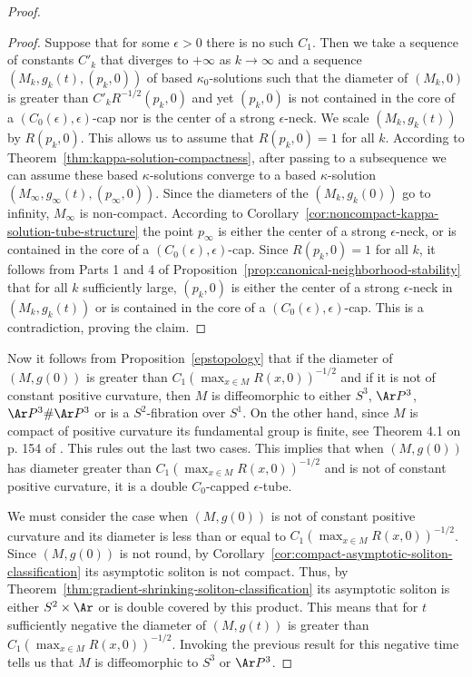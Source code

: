 \begin{proof}
\begin{proof}
Suppose that for some $\epsilon>0$ there is no such $C_1$. Then we
take a sequence of constants $C'_k$ that diverges to $+\infty$ as
$k\rightarrow \infty$ and a sequence $(M_k,g_k(t), (p_k,0))$ of
based $\kappa_0$-solutions such that the diameter of $(M_k,0)$ is
greater than $C'_kR^{-1/2}(p_k,0)$ and yet $(p_k,0)$ is not
contained in the core of a $(C_0(\epsilon),\epsilon)$-cap nor is the
center of a strong $\epsilon$-neck.  We scale $(M_k,g_k(t))$ by
$R(p_k,0)$. This allows us to assume that $R(p_k,0)=1$ for all $k$.
According to Theorem~\ref{thm:kappa-solution-compactness}, after passing to a
subsequence we can assume these based $\kappa$-solutions converge to
a based $\kappa$-solution $(M_\infty,g_\infty(t),(p_\infty,0))$.
Since the diameters of the $(M_k,g_k(0))$ go to infinity, $M_\infty$
is non-compact. According to Corollary~\ref{cor:noncompact-kappa-solution-tube-structure} the point
$p_\infty$ is either the center of a strong $\epsilon$-neck, or is
contained in the core of  a $(C_0(\epsilon),\epsilon)$-cap. Since
$R(p_k,0)=1$ for all $k$, it follows from Parts 1 and 4 of
Proposition~\ref{prop:canonical-neighborhood-stability} that for all $k$ sufficiently large,
$(p_k,0)$ is either the center of a strong $\epsilon$-neck in
$(M_k,g_k(t))$ or is contained in the core of a
$(C_0(\epsilon),\epsilon)$-cap. This is a contradiction, proving the
claim.
\end{proof}


Now it follows from Proposition~\ref{epstopology} that if the
diameter of $(M,g(0))$ is greater than $C_1(\max_{x\in
M}R(x,0))^{-1/2}$ and if it is not of constant positive curvature,
then $M$ is diffeomorphic to either $S^3$, $\Ar P^3$,  $\Ar P^3\#\Ar
P^3$ or is a $S^2$-fibration over $S^1$. On the other hand, since
$M$ is compact of positive curvature its fundamental group is
finite, see Theorem 4.1 on p. 154 of \cite{Petersen}. This rules out
the last two cases. This implies that when $(M,g(0))$ has diameter
greater than $C_1(\max_{x\in M}R(x,0))^{-1/2}$ and is not of
constant positive curvature, it is a double $C_0$-capped
$\epsilon$-tube.

We must consider the case when $(M,g(0))$ is not of constant
positive curvature and its diameter is less than or equal to
$C_1(\max_{x\in M}R(x,0))^{-1/2}$. Since $(M,g(0))$ is not
round, by Corollary~\ref{cor:compact-asymptotic-soliton-classification} its asymptotic soliton is not
compact. Thus, by Theorem~\ref{thm:gradient-shrinking-soliton-classification} its asymptotic soliton is
either $S^2\times \Ar$ or is double covered by this product. This
means that for $t$ sufficiently negative the diameter of $(M,g(t))$
is greater than $C_1(\max_{x\in M}R(x,0))^{-1/2}$. Invoking the
previous result for this negative time tells us that $M$ is
diffeomorphic to $S^3$ or $\Ar P^3$.
\end{proof}

